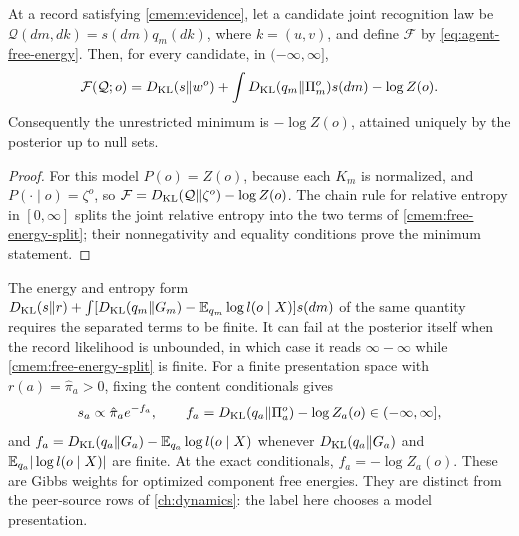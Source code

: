 At a record satisfying \cref{cmem:evidence}, let a candidate joint recognition law be $\mathcal Q(dm,dk)=s(dm)q_m(dk)$, where $k=(u,v)$, and define $\mathcal F$ by \cref{eq:agent-free-energy}. Then, for every candidate, in $(-\infty,\infty]$,
\begin{equation}
 \mathcal F(\mathcal Q;o)
 =D_{\mathrm{KL}}(s\Vert w^o)+\int D_{\mathrm{KL}}(q_m\Vert\Pi_m^o)s(dm)-\log Z(o).
 \label{cmem:free-energy-split}
\end{equation}
Consequently the unrestricted minimum is $-\log Z(o)$, attained uniquely by the posterior up to null sets.
\begin{proof}
For this model $P(o)=Z(o)$, because each $K_m$ is normalized, and $P(\cdot\mid o)=\zeta^o$, so $\mathcal F=D_{\mathrm{KL}}(\mathcal Q\Vert\zeta^o)-\log Z(o)$. The chain rule for relative entropy in $[0,\infty]$ splits the joint relative entropy into the two terms of \cref{cmem:free-energy-split}; their nonnegativity and equality conditions prove the minimum statement.
\end{proof}

The energy and entropy form $D_{\mathrm{KL}}(s\Vert r)+\int[D_{\mathrm{KL}}(q_m\Vert G_m)-\mathbb E_{q_m}\log l(o\mid X)]s(dm)$ of the same quantity requires the separated terms to be finite. It can fail at the posterior itself when the record likelihood is unbounded, in which case it reads $\infty-\infty$ while \cref{cmem:free-energy-split} is finite. For a finite presentation space with $r(a)=\hat\pi_a>0$, fixing the content conditionals gives
\begin{equation}
 s_a\propto\hat\pi_a e^{-f_a},\qquad
 f_a=D_{\mathrm{KL}}(q_a\Vert\Pi_a^o)-\log Z_a(o)\in(-\infty,\infty],
 \label{cmem:gibbs}
\end{equation}
and $f_a=D_{\mathrm{KL}}(q_a\Vert G_a)-\mathbb E_{q_a}\log l(o\mid X)$ whenever $D_{\mathrm{KL}}(q_a\Vert G_a)$ and $\mathbb E_{q_a}|\log l(o\mid X)|$ are finite. At the exact conditionals, $f_a=-\log Z_a(o)$. These are Gibbs weights for optimized component free energies. They are distinct from the peer-source rows of \cref{ch:dynamics}: the label here chooses a model presentation.

